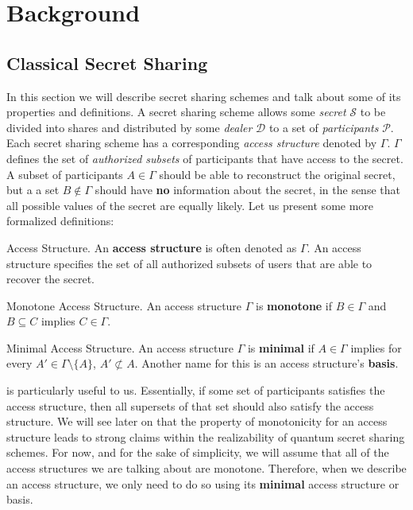 \chapter{Background}

\section{Classical Secret Sharing}

In this section we will describe secret sharing schemes and talk about some of its properties and definitions. A secret sharing scheme allows some \textit{secret} $\mathcal{S}$ to be divided into shares and distributed by some \textit{dealer} $\mathcal{D}$ to a set of \textit{participants} $\mathcal{P}$. Each secret sharing scheme has a corresponding \textit{access structure} denoted by $\Gamma$. $\Gamma$ defines the set of \textit{authorized subsets} of participants that have access to the secret. A subset of participants $A \in \Gamma$ should be able to reconstruct the original secret, but a a set $B \notin \Gamma$ should have \textbf{no} information about the secret, in the sense that all possible values of the secret are equally likely. Let us present some more formalized definitions:

\theoremstyle{definition}
\begin{definition}{Access Structure.}
    \label{defn:access-structure}
    An \textbf{access structure} is often denoted as $\Gamma$. An access structure specifies the set of all authorized subsets of users that are able to recover the secret.
\end{definition}

\theoremstyle{definition}
\begin{definition}{Monotone Access Structure.}
    \label{defn:monotone}
    An access structure $\Gamma$ is \textbf{monotone} if $B \in \Gamma$ and $B \subseteq C$ implies $C \in \Gamma$.
\end{definition}

\theoremstyle{definition}
\begin{definition}{Minimal Access Structure.}
    \label{defn:minimal}
    An access structure $\Gamma$ is \textbf{minimal} if $A \in \Gamma$ implies for every $A' \in \Gamma \setminus \{A\}$, $A' \not\subset A$. Another name for this is an access structure's \textbf{basis}.
\end{definition}

 is particularly useful to us. Essentially, if some set of participants satisfies the access structure, then all supersets of that set should also satisfy the access structure. We will see later on that the property of monotonicity for an access structure leads to strong claims within the realizability of quantum secret sharing schemes. For now, and for the sake of simplicity, we will assume that all of the access structures we are talking about are monotone. Therefore, when we describe an access structure, we only need to do so using its \textbf{minimal} access structure or basis. 

